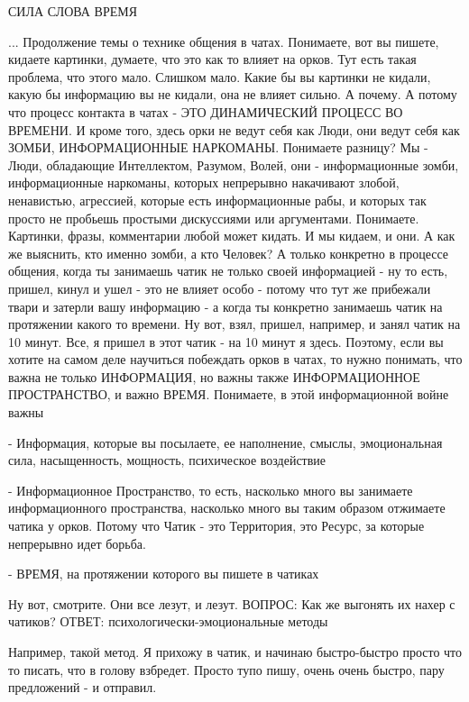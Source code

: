  
 
 
 
 

СИЛА СЛОВА 
ВРЕМЯ

... Продолжение темы о технике общения в чатах. Понимаете, вот вы пишете,
кидаете картинки, думаете, что это как то влияет на орков. Тут есть такая
проблема, что этого мало. Слишком мало. Какие бы вы картинки не кидали, какую
бы информацию вы не кидали, она не влияет сильно. А почему. А потому что
процесс контакта в чатах - ЭТО ДИНАМИЧЕСКИЙ ПРОЦЕСС ВО ВРЕМЕНИ. И кроме того,
здесь орки не ведут себя как Люди, они ведут себя как ЗОМБИ, ИНФОРМАЦИОННЫЕ
НАРКОМАНЫ. Понимаете разницу? Мы - Люди, обладающие Интеллектом, Разумом,
Волей, они - информационные зомби, информационные наркоманы, которых непрерывно
накачивают злобой, ненавистью, агрессией, которые есть информационные рабы, и
которых так просто не пробьешь простыми дискуссиями или аргументами. Понимаете.
Картинки, фразы, комментарии любой может кидать. И мы кидаем, и они. А как же
выяснить, кто именно зомби, а кто Человек? А только конкретно в процессе
общения, когда ты занимаешь чатик не только своей информацией - ну то есть,
пришел, кинул и ушел - это не влияет особо - потому что тут же прибежали твари
и затерли вашу информацию - а когда ты конкретно занимаешь чатик на протяжении
какого то времени. Ну вот, взял, пришел, например, и занял чатик на 10 минут.
Все, я пришел в этот чатик - на 10 минут я здесь. Поэтому, если вы хотите на
самом деле научиться побеждать орков в чатах, то нужно понимать, что важна не
только ИНФОРМАЦИЯ, но важны также ИНФОРМАЦИОННОЕ ПРОСТРАНСТВО, и важно ВРЕМЯ.
Понимаете, в этой информационной войне важны

- Информация, которые вы посылаете, ее наполнение, смыслы, эмоциональная сила, насыщенность, мощность, психическое воздействие

- Информационное Пространство, то есть, насколько много вы занимаете
информационного пространства, насколько много вы таким образом отжимаете чатика у орков. Потому что Чатик - это Территория, это Ресурс, за которые непрерывно идет борьба.

- ВРЕМЯ, на протяжении которого вы пишете в чатиках

Ну вот, смотрите. Они все лезут, и лезут.
ВОПРОС: Как же выгонять их нахер с чатиков?
ОТВЕТ: психологически-эмоциональные методы

Например, такой метод. Я прихожу в чатик, и начинаю быстро-быстро просто что то писать, что в голову взбредет. Просто тупо пишу, очень очень быстро, пару предложений - и отправил. 
